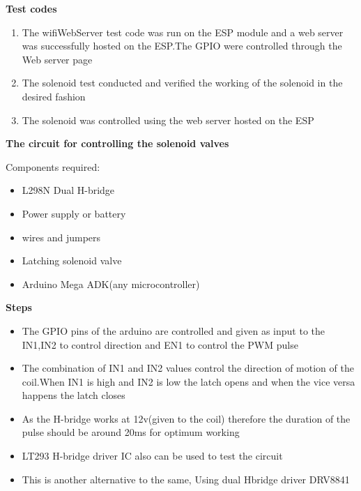 \documentclass[16pt]{article}
\begin{document}
\textbf{Test codes}

\begin{enumerate}

\item
  The wifiWebServer test code was run on the ESP module and a web server
  was successfully hosted on the ESP.The GPIO were controlled through
  the Web server page
\item
  The solenoid test conducted and verified the working of the solenoid
  in the desired fashion
\item
  The solenoid was controlled using the web server hosted on the ESP
\end{enumerate}


{\Large{\textbf{The circuit for controlling the solenoid valves}}} 

Components required:

\begin{itemize}

\item
  L298N Dual H-bridge
\item
  Power supply or battery
\item
  wires and jumpers
\item
  Latching solenoid valve
\item
  Arduino Mega ADK(any microcontroller)
\end{itemize}

\textbf{Steps}

\begin{itemize}

\item
  The GPIO pins of the arduino are controlled and given as input to the
  IN1,IN2 to control direction and EN1 to control the PWM pulse
\item
  The combination of IN1 and IN2 values control the direction of motion
  of the coil.When IN1 is high and IN2 is low the latch opens and when
  the vice versa happens the latch closes
\item
  As the H-bridge works at 12v(given to the coil) therefore the duration
  of the pulse should be around 20ms for optimum working
\item
  LT293 H-bridge driver IC also can be used to test the
  circuit%
\item
  This is another alternative to the same, Using dual Hbridge driver
  DRV8841
\end{itemize}
\end{document}

